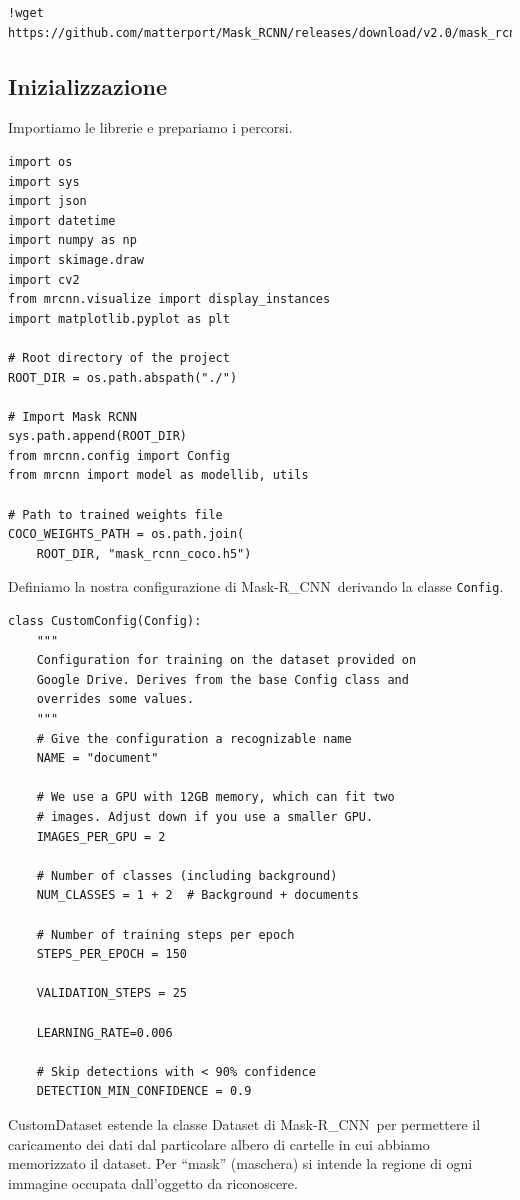\documentclass[12pt,a4paper]{article}
\newcommand{\mrcnn}{Mask-R\_CNN}
\begin{document}
\begin{verbatim}
!wget https://github.com/matterport/Mask_RCNN/releases/download/v2.0/mask_rcnn_coco.h5
\end{verbatim}

\subsection{Inizializzazione}

Importiamo le librerie e prepariamo i percorsi.

\begin{verbatim}
import os
import sys
import json
import datetime
import numpy as np
import skimage.draw
import cv2
from mrcnn.visualize import display_instances
import matplotlib.pyplot as plt

# Root directory of the project
ROOT_DIR = os.path.abspath("./")

# Import Mask RCNN
sys.path.append(ROOT_DIR)
from mrcnn.config import Config
from mrcnn import model as modellib, utils

# Path to trained weights file
COCO_WEIGHTS_PATH = os.path.join(
    ROOT_DIR, "mask_rcnn_coco.h5")
\end{verbatim}

Definiamo la nostra configurazione di \mrcnn\ derivando la classe
\texttt{Config}.

\begin{verbatim}
class CustomConfig(Config):
    """
    Configuration for training on the dataset provided on
    Google Drive. Derives from the base Config class and
    overrides some values.
    """
    # Give the configuration a recognizable name
    NAME = "document"

    # We use a GPU with 12GB memory, which can fit two
    # images. Adjust down if you use a smaller GPU.
    IMAGES_PER_GPU = 2

    # Number of classes (including background)
    NUM_CLASSES = 1 + 2  # Background + documents

    # Number of training steps per epoch
    STEPS_PER_EPOCH = 150

    VALIDATION_STEPS = 25

    LEARNING_RATE=0.006

    # Skip detections with < 90% confidence
    DETECTION_MIN_CONFIDENCE = 0.9
\end{verbatim}

CustomDataset estende la classe Dataset di \mrcnn\ per
permettere il caricamento dei dati dal particolare albero di
cartelle in cui abbiamo memorizzato il dataset.
Per ``mask'' (maschera) si intende la regione di ogni
immagine occupata dall'oggetto da riconoscere.
\end{document}
